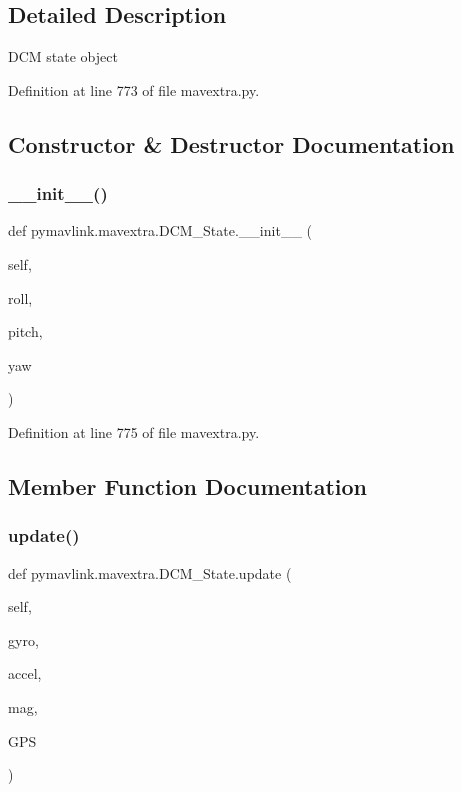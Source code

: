 \subsection{Detailed Description}
\begin{DoxyVerb}DCM state object\end{DoxyVerb}
 

Definition at line 773 of file mavextra.\+py.



\subsection{Constructor \& Destructor Documentation}
\mbox{\label{classpymavlink_1_1mavextra_1_1DCM__State_a1f20ca8f9381120815f5cf1eff5d19ae}} 
\subsubsection{\texorpdfstring{\_\_init\_\_()}{\_\_init\_\_()}}
{\footnotesize\ttfamily def pymavlink.\+mavextra.\+D\+C\+M\+\_\+\+State.\+\_\+\+\_\+init\+\_\+\+\_\+ (\begin{DoxyParamCaption}\item[{}]{self,  }\item[{}]{roll,  }\item[{}]{pitch,  }\item[{}]{yaw }\end{DoxyParamCaption})}



Definition at line 775 of file mavextra.\+py.



\subsection{Member Function Documentation}
\mbox{\label{classpymavlink_1_1mavextra_1_1DCM__State_a1d4bde9feb6f1b8ca501f96c914bac27}} 
\subsubsection{\texorpdfstring{update()}{update()}}
{\footnotesize\ttfamily def pymavlink.\+mavextra.\+D\+C\+M\+\_\+\+State.\+update (\begin{DoxyParamCaption}\item[{}]{self,  }\item[{}]{gyro,  }\item[{}]{accel,  }\item[{}]{mag,  }\item[{}]{G\+PS }\end{DoxyParamCaption})}



